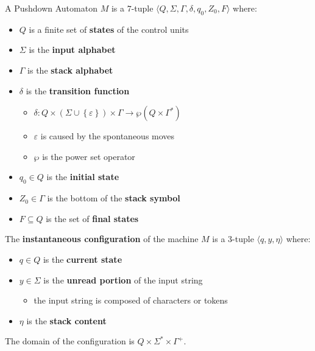 \documentclass[english]{article}
\begin{document}
\begin{definition}
  \label{def:pushdown-automaton}
  A Pushdown Automaton \(M\) is a \(7\)-tuple \(\langle Q, \Sigma, \Gamma, \delta, q_0, Z_0, F \rangle\) where:

  \begin{itemize}
    \item \(Q\) is a finite set of \textbf{states} of the control units
    \item \(\Sigma\) is the \textbf{input alphabet}
    \item \(\Gamma\) is the \textbf{stack alphabet}
    \item \(\delta\) is the \textbf{transition function}
          \begin{itemize}
            \item \(\delta: Q \times \left( \Sigma \cup \left\{ \varepsilon \right\} \right) \times \Gamma \rightarrow \wp \left( Q \times \Gamma^\ast \right)\)
            \item \(\varepsilon\) is caused by the spontaneous moves
            \item \(\wp\) is the power set operator
          \end{itemize}
    \item \(q_0 \in Q\) is the \textbf{initial state}
    \item \(Z_0 \in \Gamma\) is the bottom of the \textbf{stack symbol}
    \item \(F \subseteq Q\) is the set of \textbf{final states}
  \end{itemize}
\end{definition}

\begin{definition}
  The \textbf{instantaneous configuration} of the machine \(M\) is a \(3\)-tuple \(\langle q, y, \eta \rangle\) where:

  \begin{itemize}
    \item \(q \in Q\) is the \textbf{current state}
    \item \(y \in \Sigma\) is the \textbf{unread portion} of the input string
          \begin{itemize}
            \item the input string is composed of characters or tokens
          \end{itemize}
    \item \(\eta\) is the \textbf{stack content}
  \end{itemize}

  The domain of the configuration is \(Q \times \Sigma^\ast \times \Gamma^+\).
\end{definition}
\end{document}
